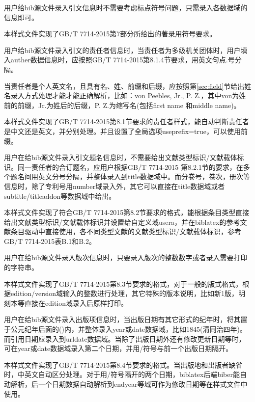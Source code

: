 \begin{property}{}{}
用户给bib源文件录入引文信息时不需要考虑标点符号问题，只需录入各数据域的信息即可。

本样式文件实现了GB/T 7714-2015第7部分所给出的著录用符号要求。
\end{property}

\begin{property}{}{}
用户给bib源文件录入引文的责任者信息时，当责任者为多级机关团体时，用户填入auther数据信息时，应按照GB/T 7714-2015第8.1.4节要求，用英文句点.号分隔。

当责任者是个人英文名，且具有名、姓、前缀和后缀，应按照第\ref{sec:field}节给出姓名录入方式处理才能才能正确解析，比如：von Peebles, Jr., P. Z.，其中von为姓前的前缀，Jr.为姓后的后缀，P. Z.为缩写名(包括first name 和middle name)。

本样式文件实现了GB/T 7714-2015第8.1节要求的责任者样式，能自动判断责任者是中文还是英文，并分别处理。并且设置了全局选项useprefix=true，可以使用前缀。
\end{property}

\begin{property}{}{}
用户在给bib源文件录入引文题名信息时，不需要给出文献类型标识/文献载体标识。同一责任者的合订题名，应用户根据GB/T 7714-2015 第8.2.1节的要求，在多个题名间用英文分号分隔，并整体录入到title数据域中。而分卷号，卷次，册次等信息时，除了专利号用number域录入外，其它可以直接在title数据域或者subtitle/titleaddon等数据域中给出。

本样式文件实现了符合GB/T 7714-2015第8.2节要求的格式，能根据条目类型直接给出文献类型标识/文献载体标识并设置给自定义域usera，并在biblatex的参考文献条目驱动中直接使用，各不同类型文献的文献类型标识/文献载体标识，参考GB/T 7714-2015表B.1和B.2。
\end{property}

\begin{property}{}{}
用户在给bib源文件录入版次信息时，只要录入版次的整数数字或者录入需要打印的字符串。

本样式文件实现了GB/T 7714-2015第8.3节要求的格式，对于一般的版式格式，根据edition/version域输入的整数进行处理，其它特殊的版本说明，比如新1版，明刻本等直接在edition域录入后原样打印。
\end{property}

\begin{property}{}{}
用户在给bib源文件录入出版项信息时，当出版日期有其它形式的纪年时，将其置于公元纪年后面的()内，并整体录入year或date数据域，比如1845(清同治四年)。而引用日期应录入到urldate数据域。当除了出版日期外还有修改更新日期等时，可在year或date数据域录入第二个日期，并用/符号与前一个出版日期隔开。

本样式文件实现了GB/T 7714-2015第8.4节要求的格式。当出版地和出版者缺省时，中英文自动区分处理。对于用/符号隔开的两个日期，biblatex后端biber能自动解析，后一个日期数据自动解析到endyear等域可作为修改日期等在样式文件中使用。
\end{property}


